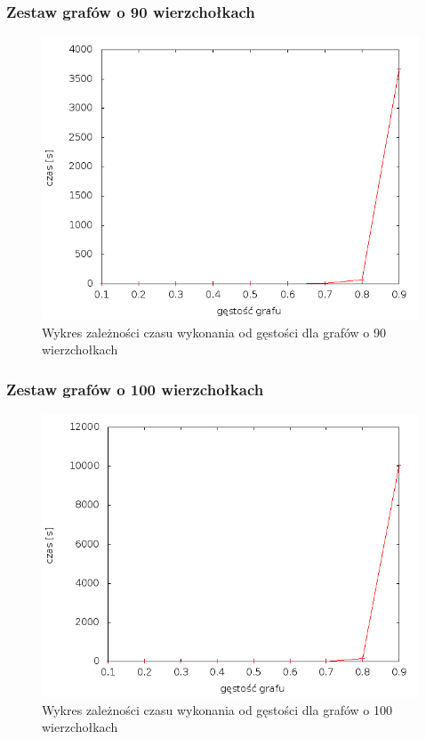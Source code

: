 \documentclass[12pt, a4paper]{article}
\begin{document}
\subsubsection*{Zestaw grafów o 90 wierzchołkach}
\begin{figure}[!h]
    \begin{center}
	\includegraphics[scale=0.5]{results/img/dim/dim_90.png}
	\caption{Wykres zależności czasu wykonania od gęstości dla grafów o 90 wierzchołkach}
    \end{center}
\end{figure}
\FloatBarrier
\subsubsection*{Zestaw grafów o 100 wierzchołkach}
\begin{figure}[!h]
    \begin{center}
	\includegraphics[scale=0.5]{results/img/dim/dim_100.png}
	\caption{Wykres zależności czasu wykonania od gęstości dla grafów o 100 wierzchołkach}
    \end{center}
\end{figure}
\FloatBarrier
\end{document}
